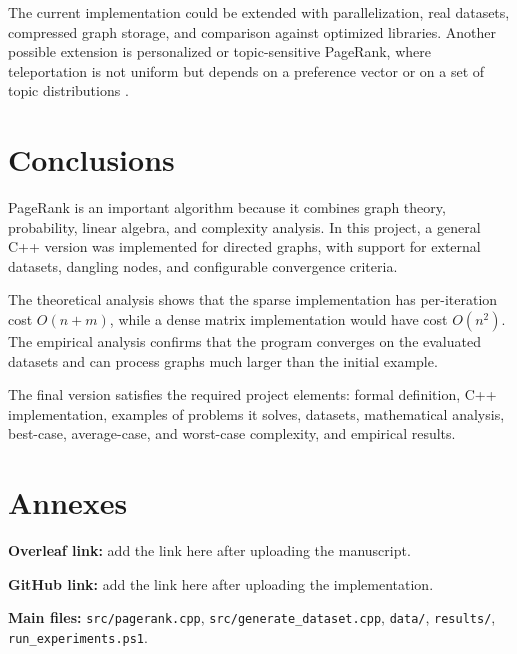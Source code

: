 \documentclass[runningheads]{llncs}
\begin{document}
The current implementation could be extended with parallelization, real datasets, compressed graph storage, and comparison against optimized libraries. Another possible extension is personalized or topic-sensitive PageRank, where teleportation is not uniform but depends on a preference vector or on a set of topic distributions \cite{haveliwala2002topic}.

\section{Conclusions}

PageRank is an important algorithm because it combines graph theory, probability, linear algebra, and complexity analysis. In this project, a general C++ version was implemented for directed graphs, with support for external datasets, dangling nodes, and configurable convergence criteria.

The theoretical analysis shows that the sparse implementation has per-iteration cost \(O(n+m)\), while a dense matrix implementation would have cost \(O(n^2)\). The empirical analysis confirms that the program converges on the evaluated datasets and can process graphs much larger than the initial example.

The final version satisfies the required project elements: formal definition, C++ implementation, examples of problems it solves, datasets, mathematical analysis, best-case, average-case, and worst-case complexity, and empirical results.

\section*{Annexes}

\textbf{Overleaf link:} add the link here after uploading the manuscript.

\textbf{GitHub link:} add the link here after uploading the implementation.

\textbf{Main files:} \texttt{src/pagerank.cpp}, \texttt{src/generate\_dataset.cpp}, \texttt{data/}, \texttt{results/}, \texttt{run\_experiments.ps1}.
\end{document}
